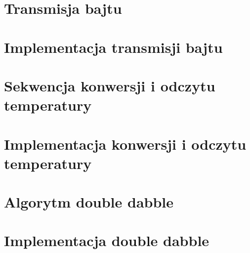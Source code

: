 \documentclass[a4paper]{article}
\begin{document}
\section{Transmisja bajtu}



\section{Implementacja transmisji bajtu}
\section{Sekwencja konwersji i odczytu temperatury}
\section{Implementacja konwersji i odczytu temperatury}
\section{Algorytm double dabble}
\section{Implementacja double dabble}
\end{document}
